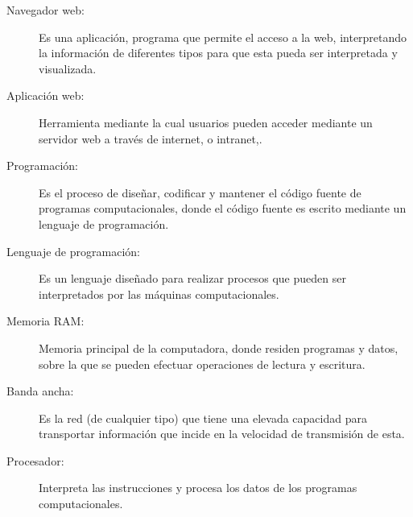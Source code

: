 \begin{description}
	\item [Navegador web:]  Es una aplicación, programa que permite el acceso a la web, interpretando la información de diferentes tipos para que esta pueda ser interpretada y visualizada.

	\item [Aplicación web:]Herramienta mediante la cual usuarios pueden acceder mediante un servidor web a través de internet, o intranet,.
	
 	\item [Programación:]Es el proceso de diseñar, codificar y mantener el código fuente de programas computacionales, donde el código fuente es escrito mediante un lenguaje de programación.
 	
 	\item [ Lenguaje de programación:]Es un lenguaje diseñado para realizar procesos que pueden ser interpretados por las máquinas computacionales.
 	
 	\item [Memoria RAM:]Memoria principal de la computadora, donde residen programas y datos, sobre la que se pueden efectuar operaciones de lectura y escritura.
 	
 	\item [Banda ancha:]Es la red (de cualquier tipo) que tiene una elevada capacidad para transportar información que incide en la velocidad de transmisión de esta.
 	
 	\item [Procesador:]Interpreta las instrucciones y procesa los datos de los programas computacionales.
 	
 
 	
\end{description}

